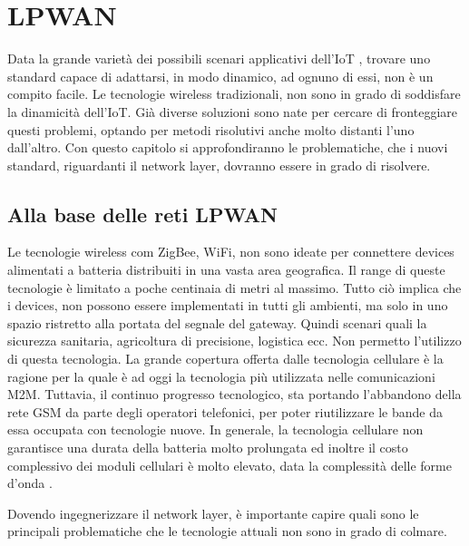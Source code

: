 \chapter{LPWAN}
Data la grande varietà dei possibili scenari applicativi dell'IoT , trovare uno standard
capace di adattarsi, in modo dinamico, ad ognuno di essi, non è un compito
facile. Le tecnologie wireless tradizionali, non sono in grado di soddisfare
la dinamicità  dell'IoT.
Già diverse soluzioni sono nate per cercare di fronteggiare questi
problemi, optando per metodi risolutivi  anche molto distanti l'uno dall'altro.
Con questo capitolo si approfondiranno le problematiche, che i nuovi standard, riguardanti il
network layer, dovranno essere in grado di risolvere.
\section{Alla base delle reti LPWAN}  
Le tecnologie wireless com ZigBee, WiFi, non sono ideate per connettere devices
alimentati a batteria distribuiti in una vasta area geografica.
Il range di queste tecnologie è limitato a poche centinaia di metri al massimo.
Tutto ciò implica che i devices, non possono essere implementati in tutti gli
ambienti, ma solo in uno spazio ristretto alla portata del segnale del gateway.
Quindi scenari quali la sicurezza sanitaria, agricoltura di precisione, logistica ecc. Non
permetto l'utilizzo di questa tecnologia.
La grande copertura offerta dalle tecnologia cellulare è la ragione per la quale
è ad oggi la tecnologia più utilizzata nelle comunicazioni M2M.
Tuttavia, il continuo progresso tecnologico, sta portando l'abbandono della rete
GSM da parte degli operatori telefonici, per poter riutilizzare le bande da essa
occupata con tecnologie nuove. In generale, la tecnologia cellulare non
garantisce una durata della batteria molto prolungata ed inoltre il costo
complessivo dei moduli cellulari è molto elevato, data la complessità delle 
forme d'onda .

Dovendo ingegnerizzare il network layer, è importante capire quali sono le
principali problematiche che le tecnologie attuali non sono in grado di colmare.

